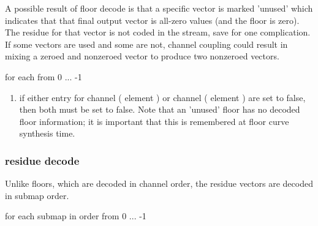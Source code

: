 A possible result of floor decode is that a specific vector is marked
'unused' which indicates that that final output vector is all-zero
values (and the floor is zero).  The residue for that vector is not
coded in the stream, save for one complication.  If some vectors are
used and some are not, channel coupling could result in mixing a
zeroed and nonzeroed vector to produce two nonzeroed vectors.

for each \varname{[i]} from 0 ... -1

\begin{enumerate}
 \item if either \varname{[no_residue]} entry for channel
( element \varname{[i]})
or channel
( element \varname{[i]})
are set to false, then both must be set to false.  Note that an 'unused'
floor has no decoded floor information; it is important that this is
remembered at floor curve synthesis time.
\end{enumerate}




\subsubsection{residue decode}

Unlike floors, which are decoded in channel order, the residue vectors
are decoded in submap order.

for each submap \varname{[i]} in order from 0 ... -1

